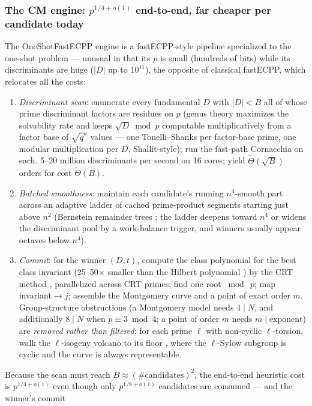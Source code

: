 \documentclass[11pt]{amsart}
\newcommand{\Tt}{\widetilde{\Theta}}
\newcommand{\osf}{\cite{OSF}}
\theoremstyle{plain}
\theoremstyle{definition}
\theoremstyle{remark}
\begin{document}
\subsubsection{The CM engine: \texorpdfstring{$p^{1/4+o(1)}$}{p\string^(1/4+o(1))} end-to-end, far cheaper per candidate today}
\label{sec:cmoneshot}
The OneShotFastECPP engine \osf{} is a fastECPP-style pipeline specialized to the one-shot problem ---
unusual in that its $p$ is small (hundreds of bits) while its discriminants are huge ($|D|$ up to
$10^{11}$), the opposite of classical fastECPP, which relocates all the costs:
\begin{enumerate}
\item \emph{Discriminant scan}: enumerate every fundamental $D$ with $|D| < B$ all of whose prime
discriminant factors are residues on $p$ (genus theory maximizes the solvability rate and keeps
$\sqrt D \bmod p$ computable multiplicatively from a factor base of $\sqrt{q^*}$ values --- one
Tonelli--Shanks per factor-base prime, one modular multiplication per $D$, Shallit-style); run the
fast-path Cornacchia on each.  5--20 million discriminants per second on 16 cores; yield $\Tt(\sqrt B)$
orders for cost $\Tt(B)$.
\item \emph{Batched smoothness}: maintain each candidate's running $n^4$-smooth part across an adaptive
ladder of cached prime-product segments starting just above $n^2$ (Bernstein remainder trees
\cite{Bern04}; the ladder deepens toward $n^4$ or widens the discriminant pool by a work-balance
trigger, and winners usually appear octaves below $n^4$).
\item \emph{Commit}: for the winner $(D, t)$, compute the class polynomial for the best class invariant
(25--50$\times$ smaller than the Hilbert polynomial \cite{Suth12}) by the CRT method \cite{Suth11},
parallelized across CRT primes; find one root $\bmod\ p$; map invariant${}\to{}j$; assemble the Montgomery
curve and a point of exact order $m$.  Group-structure obstructions (a Montgomery model needs
$4 \mid N$, and additionally $8 \mid N$ when $p \equiv 3 \bmod 4$; a point of order $m$ needs
$m \mid \text{exponent}$) are \emph{removed rather than filtered}: for each prime $\ell$ with non-cyclic
$\ell$-torsion, walk the $\ell$-isogeny volcano to its floor \cite{Suth13,FM02}, where the
$\ell$-Sylow subgroup is cyclic and the curve is always representable.
\end{enumerate}
Because the scan must reach $B \approx (\#\text{candidates})^2$, the end-to-end heuristic cost is
$p^{1/4+o(1)}$ even though only $p^{1/8+o(1)}$ candidates are consumed --- and the winner's commit
\end{document}
